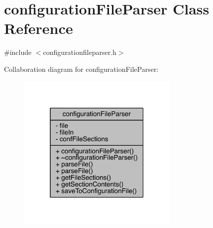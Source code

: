 \hypertarget{classconfiguration_file_parser}{\section{configuration\+File\+Parser Class Reference}
\label{classconfiguration_file_parser}
}


{\ttfamily \#include $<$configurationfileparser.\+h$>$}



Collaboration diagram for configuration\+File\+Parser\+:\nopagebreak
\begin{figure}[H]
\begin{center}
\leavevmode
\includegraphics[width=220pt]{classconfiguration_file_parser__coll__graph}
\end{center}
\end{figure}
